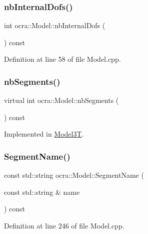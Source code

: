 \subsubsection{\texorpdfstring{nb\+Internal\+Dofs()}{nbInternalDofs()}}
{\footnotesize\ttfamily int ocra\+::\+Model\+::nb\+Internal\+Dofs (\begin{DoxyParamCaption}{ }\end{DoxyParamCaption}) const}



Definition at line 58 of file Model.\+cpp.

\hypertarget{classocra_1_1Model_acd57284b64bb5c05f4c2dac643476751}{}\label{classocra_1_1Model_acd57284b64bb5c05f4c2dac643476751} 
\subsubsection{\texorpdfstring{nb\+Segments()}{nbSegments()}}
{\footnotesize\ttfamily virtual int ocra\+::\+Model\+::nb\+Segments (\begin{DoxyParamCaption}{ }\end{DoxyParamCaption}) const\hspace{0.3cm}{\ttfamily [pure virtual]}}



Implemented in \hyperlink{classModel3T_af8ca577236d173d0f7860263fb7872a4}{Model3T}.

\hypertarget{classocra_1_1Model_ad3f2a303f3120035780e7f4ad457b902}{}\label{classocra_1_1Model_ad3f2a303f3120035780e7f4ad457b902} 
\subsubsection{\texorpdfstring{Segment\+Name()}{SegmentName()}}
{\footnotesize\ttfamily const std\+::string ocra\+::\+Model\+::\+Segment\+Name (\begin{DoxyParamCaption}\item[{const std\+::string \&}]{name }\end{DoxyParamCaption}) const}



Definition at line 246 of file Model.\+cpp.

\hypertarget{classocra_1_1Model_aaebe8934b2c8f0620e4208f696ea11cf}{}\label{classocra_1_1Model_aaebe8934b2c8f0620e4208f696ea11cf} 

